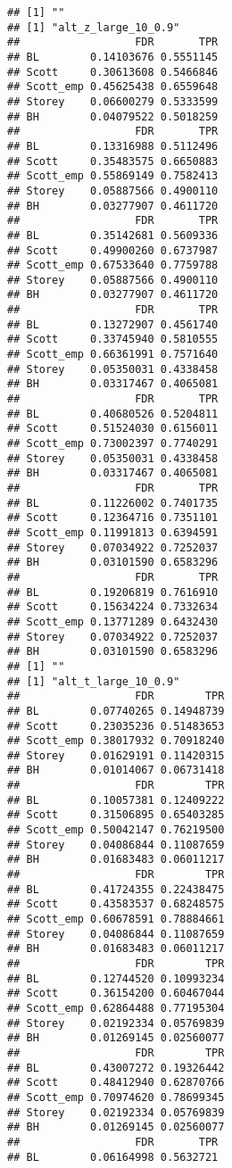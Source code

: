 \documentclass{article}\usepackage[]{graphicx}\usepackage[]{color}
\makeatletter
\newenvironment{kframe}{%
 \def\at@end@of@kframe{}%
 \ifinner\ifhmode%
  \def\at@end@of@kframe{\end{minipage}}%
  \begin{minipage}{\columnwidth}%
 \fi\fi%
 \def\FrameCommand##1{\hskip\@totalleftmargin \hskip-\fboxsep
 \colorbox{shadecolor}{##1}\hskip-\fboxsep
     \hskip-\linewidth \hskip-\@totalleftmargin \hskip\columnwidth}%
 \MakeFramed {\advance\hsize-\width
   \@totalleftmargin\z@ \linewidth\hsize
   \@setminipage}}%
 {\par\unskip\endMakeFramed%
 \at@end@of@kframe}
\newenvironment{knitrout}{}{} %
\makeatother
\begin{document}
\begin{knitrout}
\begin{kframe}
\begin{verbatim}
## [1] ""
## [1] "alt_z_large_10_0.9"
##                  FDR       TPR
## BL        0.14103676 0.5551145
## Scott     0.30613608 0.5466846
## Scott_emp 0.45625438 0.6559648
## Storey    0.06600279 0.5333599
## BH        0.04079522 0.5018259
##                  FDR       TPR
## BL        0.13316988 0.5112496
## Scott     0.35483575 0.6650883
## Scott_emp 0.55869149 0.7582413
## Storey    0.05887566 0.4900110
## BH        0.03277907 0.4611720
##                  FDR       TPR
## BL        0.35142681 0.5609336
## Scott     0.49900260 0.6737987
## Scott_emp 0.67533640 0.7759788
## Storey    0.05887566 0.4900110
## BH        0.03277907 0.4611720
##                  FDR       TPR
## BL        0.13272907 0.4561740
## Scott     0.33745940 0.5810555
## Scott_emp 0.66361991 0.7571640
## Storey    0.05350031 0.4338458
## BH        0.03317467 0.4065081
##                  FDR       TPR
## BL        0.40680526 0.5204811
## Scott     0.51524030 0.6156011
## Scott_emp 0.73002397 0.7740291
## Storey    0.05350031 0.4338458
## BH        0.03317467 0.4065081
##                  FDR       TPR
## BL        0.11226002 0.7401735
## Scott     0.12364716 0.7351101
## Scott_emp 0.11991813 0.6394591
## Storey    0.07034922 0.7252037
## BH        0.03101590 0.6583296
##                  FDR       TPR
## BL        0.19206819 0.7616910
## Scott     0.15634224 0.7332634
## Scott_emp 0.13771289 0.6432430
## Storey    0.07034922 0.7252037
## BH        0.03101590 0.6583296
## [1] ""
## [1] "alt_t_large_10_0.9"
##                  FDR        TPR
## BL        0.07740265 0.14948739
## Scott     0.23035236 0.51483653
## Scott_emp 0.38017932 0.70918240
## Storey    0.01629191 0.11420315
## BH        0.01014067 0.06731418
##                  FDR        TPR
## BL        0.10057381 0.12409222
## Scott     0.31506895 0.65403285
## Scott_emp 0.50042147 0.76219500
## Storey    0.04086844 0.11087659
## BH        0.01683483 0.06011217
##                  FDR        TPR
## BL        0.41724355 0.22438475
## Scott     0.43583537 0.68248575
## Scott_emp 0.60678591 0.78884661
## Storey    0.04086844 0.11087659
## BH        0.01683483 0.06011217
##                  FDR        TPR
## BL        0.12744520 0.10993234
## Scott     0.36154200 0.60467044
## Scott_emp 0.62864488 0.77195304
## Storey    0.02192334 0.05769839
## BH        0.01269145 0.02560077
##                  FDR        TPR
## BL        0.43007272 0.19326442
## Scott     0.48412940 0.62870766
## Scott_emp 0.70974620 0.78699345
## Storey    0.02192334 0.05769839
## BH        0.01269145 0.02560077
##                  FDR       TPR
## BL        0.06164998 0.5632721

\end{verbatim}
\end{kframe}
\end{knitrout}
\end{document}
